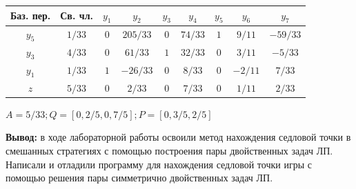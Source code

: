 \documentclass[a4paper,14pt]{extarticle}
\begin{document}
\begin{center}
\begin{longtable}{|c|c|c|c|c|c|c|c|c|}
        \hline
        Баз. пер. & Св. чл.    & $y_1$    & $y_2$    & $y_3$    & $y_4 $     & $y_5$     & $y_6$ & $y_7$     \\
        \hline
        $y_5$     & $1/33$        & $0$      & $205/33$      & $0$      & $74/33$        & $1$      & $9/11$   & $-59/33$       \\
        \hline
        $y_3$     & $4/33$        & $0$     & $61/33$      & $1$      & $32/33$        & $0$      & $3/11$   & $-5/33$       \\
        \hline
        $y_1$     & $1/33$        & $1$     & $-26/33$      & $0$      & $8/33$        & $0$      & $-2/11$   & $7/33$       \\
        \hline
        $z$      & $5/33$        & $0$     & $2/33$     & $0$     & $7/33$       & $0$       & $1/11$   & $2/33$ \\
        \hline
    \end{longtable}
\end{center}

$A = 5/33; Q = [0, 2/5, 0, 7/5]; P = [0, 3/5, 2/5]$

\textbf{Вывод: } в ходе лабораторной работы освоили метод нахождения седловой точки в
смешанных стратегиях с помощью построения пары двойственных
задач ЛП. Написали и отладили программу для нахождения седловой точки
игры с помощью решения пары симметрично двойственных задач
ЛП.
\end{document}
